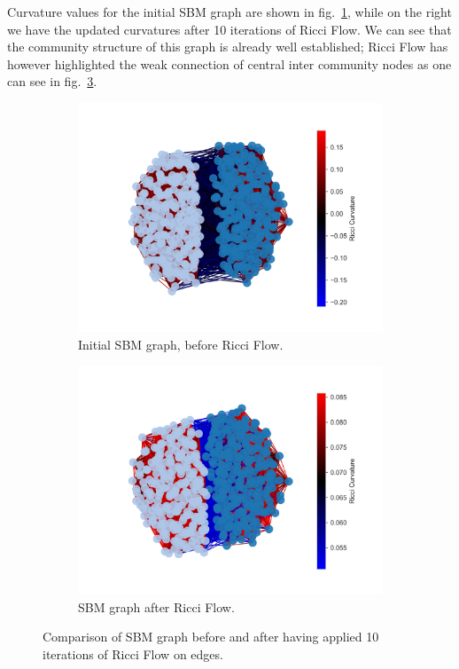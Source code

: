 Curvature values for the initial SBM graph are shown in fig.~\ref{fig:SBM_comparison_a}, while on the right we have the updated curvatures after 10 iterations of Ricci Flow. We can see that the community structure of this graph is already well established; Ricci Flow has however highlighted the weak connection of central inter community nodes as one can see in fig.~\ref{fig:SBM_comparison_b}.
\begin{figure}
    \centering
    \begin{subfigure}{0.45\textwidth}
        \centering
        \includegraphics[width=\textwidth]{../tests/ToyModelResults/SBM/Before Ricci Flow.png}
        \caption{Initial SBM graph, before Ricci Flow.}
        \label{fig:SBM_comparison_a}
    \end{subfigure}
    \hfill
    \begin{subfigure}{0.45\textwidth}
        \centering
        \includegraphics[width=\textwidth]{../tests/ToyModelResults/SBM/After Ricci Flow.png}
        \caption{SBM graph after Ricci Flow.}
        \label{fig:SBM_comparison_b}
    \end{subfigure}
    \caption{Comparison of SBM graph before and after having applied 10 iterations of Ricci Flow on edges.}
\end{figure}

